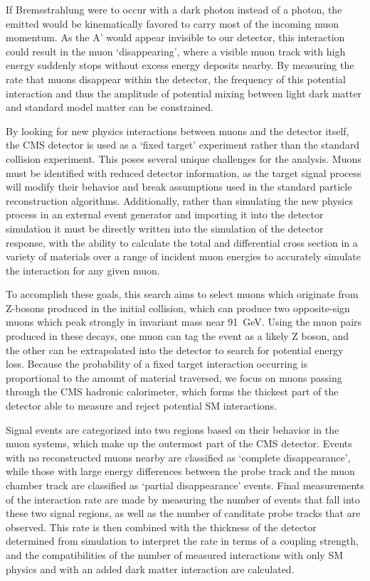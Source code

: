 If Bremsstrahlung were to occur with a dark photon instead of a photon, the emitted \aprime would be kinematically favored to carry most of the incoming muon momentum.
As the A' would appear invisible to our detector, this interaction could result in the muon `disappearing', where a visible muon track with high energy suddenly stops without excess energy deposits nearby.
By measuring the rate that muons disappear within the detector, the frequency of this potential interaction and thus the amplitude of potential mixing between light dark matter and standard model matter can be constrained.

By looking for new physics interactions between muons and the detector itself, the CMS detector is used as a `fixed target' experiment rather than the standard collision experiment.
This poses several unique challenges for the analysis.
Muons must be identified with reduced detector information, as the target signal process will modify their behavior and break assumptions used in the standard particle reconstruction algorithms.
Additionally, rather than simulating the new physics process in an external event generator and importing it into the detector simulation it must be directly written into the simulation of the detector response, with the ability to calculate the total and differential cross section in a variety of materials over a range of incident muon energies to accurately simulate the interaction for any given muon.

To accomplish these goals, this search aims to select muons which originate from Z-bosons produced in the initial collision, which can produce two opposite-sign muons which peak strongly in invariant mass near \SI{91}{\giga\eV}.
Using the muon pairs produced in these decays, one muon can tag the event as a likely Z boson, and the other can be extrapolated into the detector to search for potential energy loss.
Because the probability of a fixed target interaction occurring is proportional to the amount of material traversed, we focus on muons passing through the CMS hadronic calorimeter, which forms the thickest part of the detector able to measure and reject potential SM interactions.

Signal events are categorized into two regions based on their behavior in the muon systems, which make up the outermost part of the CMS detector. 
Events with no reconstructed muons nearby are classified as `complete disappearance', while those with large energy differences between the probe track and the muon chamber track are classified as `partial disappearance' events.
Final measurements of the interaction rate are made by measuring the number of events that fall into these two signal regions, as well as the number of canditate probe tracks that are observed.
This rate is then combined with the thickness of the detector determined from simulation to interpret the rate in terms of a coupling strength, and the compatibilities of the number of measured interactions with only SM physics and with an added dark matter interaction are calculated.

